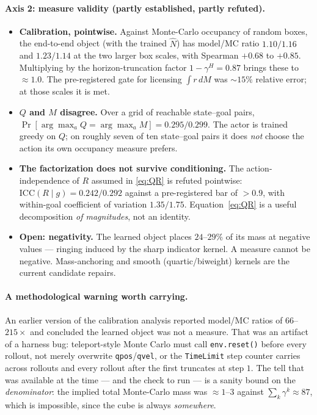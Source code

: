 \documentclass[11pt]{article}
\begin{document}
\paragraph{Axis 2: measure validity (partly established, partly refuted).}
\begin{itemize}[leftmargin=1.5em]
\item \textbf{Calibration, pointwise.} Against Monte-Carlo occupancy of random
boxes, the end-to-end object (with the trained $\hat N$) has model/MC ratio
$1.10/1.16$ and $1.23/1.14$ at the two larger box scales, with Spearman $+0.68$ to
$+0.85$. Multiplying by the horizon-truncation factor $1-\gamma^{H}=0.87$ brings
these to $\approx 1.0$. The pre-registered gate for licensing $\int r\,dM$ was
$\sim15\%$ relative error; at those scales it is met.
\item \textbf{$Q$ and $M$ disagree.} Over a grid of reachable state--goal pairs,
$\Pr[\arg\max_a Q = \arg\max_a M] = 0.295/0.299$. The actor is trained greedy on
$Q$; on roughly seven of ten state--goal pairs it does \emph{not} choose the
action its own occupancy measure prefers.
\item \textbf{The factorization does not survive conditioning.} The
action-independence of $R$ assumed in \eqref{eq:QR} is refuted pointwise:
$\mathrm{ICC}(R\mid g)=0.242/0.292$ against a pre-registered bar of $>0.9$, with
within-goal coefficient of variation $1.35/1.75$. Equation~\eqref{eq:QR} is a
useful decomposition \emph{of magnitudes}, not an identity.
\item \textbf{Open: negativity.} The learned object places $24$--$29\%$ of its mass
at negative values --- ringing induced by the sharp indicator kernel. A measure
cannot be negative. Mass-anchoring and smooth (quartic/biweight) kernels are the
current candidate repairs.
\end{itemize}

\paragraph{A methodological warning worth carrying.} An earlier version of the
calibration analysis reported model/MC ratios of $66$--$215\times$ and concluded
the learned object was not a measure. That was an artifact of a harness bug:
teleport-style Monte Carlo must call \texttt{env.reset()} before every rollout,
not merely overwrite \texttt{qpos}/\texttt{qvel}, or the \texttt{TimeLimit} step
counter carries across rollouts and every rollout after the first truncates at
step $1$. The tell that was available at the time --- and the check to run --- is a
sanity bound on the \emph{denominator}: the implied total Monte-Carlo mass was
$\approx1$--$3$ against $\sum_k\gamma^k\approx87$, which is impossible, since the
cube is always \emph{somewhere}.
\end{document}
